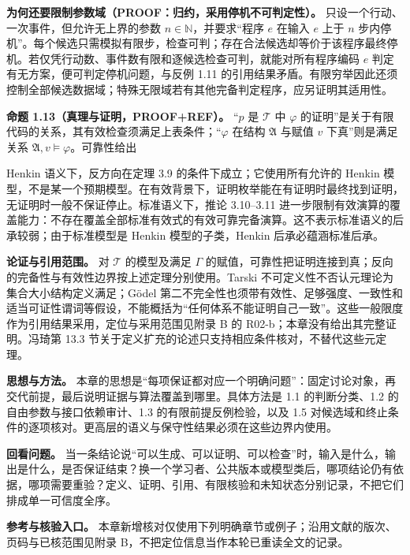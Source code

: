 \documentclass[UTF8,a4paper,zihao=-4,fontset=windows,openany]{ctexbook}
\newcommand{\mcsdisplay}[1]{%
  \par\addvspace{0.7em}%
  \sbox{\mcsmathbox}{\ensuremath{\displaystyle #1}}%
  \ifdim\wd\mcsmathbox>\linewidth
    \noindent\resizebox{\linewidth}{!}{\usebox{\mcsmathbox}}%
  \else
    \noindent\hspace*{\fill}\usebox{\mcsmathbox}\hspace*{\fill}%
  \fi
  \par\addvspace{0.7em}%
}
\def\ensuremath#1{#1}%
\begin{document}
\textbf{为何还要限制参数域（PROOF：归约，采用停机不可判定性）。} 只设一个行动、一次事件，但允许无上界的参数 \(n\in\mathbb N\)，并要求“程序 \(e\) 在输入 \(e\) 上于 \(n\) 步内停机”。每个候选只需模拟有限步，检查可判；存在合法候选却等价于该程序最终停机。若仅凭行动数、事件数有限和逐候选检查可判，就能对所有程序编码 \(e\) 判定有无方案，便可判定停机问题，与反例 1.11 的引用结果矛盾。有限穷举因此还须控制全部候选数据域；特殊无限域若有其他完备判定程序，应另证明其适用性。

\textbf{命题 1.13（真理与证明，PROOF+REF）。} “\(p\) 是 \(\mathcal T\) 中 \(\varphi\) 的证明”是关于有限代码的关系，其有效检查须满足上表条件；“\(\varphi\) 在结构 \(\mathfrak A\) 与赋值 \(v\) 下真”则是满足关系 \(\mathfrak A,v\models\varphi\)。可靠性给出


\mcsdisplay{\Gamma\vdash_{\mathcal T}\varphi
\quad\Longrightarrow\quad
\mathcal T\cup\Gamma\models_{\mathcal K}\varphi.}
\noindent Henkin 语义下，反方向在定理 3.9 的条件下成立；它使用所有允许的 Henkin 模型，不是某一个预期模型。在有效背景下，证明枚举能在有证明时最终找到证明，无证明时一般不保证停止。标准语义下，推论 3.10–3.11 进一步限制有效演算的覆盖能力：不存在覆盖全部标准有效式的有效可靠完备演算。这不表示标准语义的后承较弱；由于标准模型是 Henkin 模型的子类，Henkin 后承必蕴涵标准后承。

\textbf{论证与引用范围。} 对 \(\mathcal T\) 的模型及满足 \(\Gamma\) 的赋值，可靠性把证明连接到真；反向的完备性与有效性边界按上述定理分别使用。Tarski 不可定义性不否认元理论为集合大小结构定义满足；Gödel 第二不完全性也须带有效性、足够强度、一致性和适当可证性谓词等假设，不能概括为“任何体系不能证明自己一致”。这些一般限度作为引用结果采用，定位与采用范围见附录 B 的 R02-b；本章没有给出其完整证明。冯琦第 13.3 节关于定义扩充的论述只支持相应条件核对，不替代这些元定理。

\textbf{思想与方法。} 本章的思想是“每项保证都对应一个明确问题”：固定讨论对象，再交代前提，最后说明证据与算法覆盖到哪里。具体方法是 1.1 的判断分类、1.2 的自由参数与接口依赖审计、1.3 的有限前提反例检验，以及 1.5 对候选域和终止条件的逐项核对。更高层的语义与保守性结果必须在这些边界内使用。

\textbf{回看问题。} 当一条结论说“可以生成、可以证明、可以检查”时，输入是什么，输出是什么，是否保证结束？换一个学习者、公共版本或模型类后，哪项结论仍有依据，哪项需要重验？定义、证明、引用、有限核验和未知状态分别记录，不把它们排成单一可信度全序。

\textbf{参考与核验入口。} 本章新增核对仅使用下列明确章节或例子；沿用文献的版次、页码与已核范围见附录 B，不把定位信息当作本轮已重读全文的记录。
\end{document}
